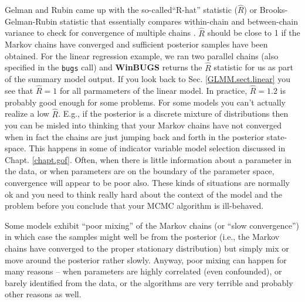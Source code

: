 Gelman and Rubin came up with the so-called``R-hat''
statistic ($\hat{R}$) or Brooks-Gelman-Rubin statistic that
essentially compares within-chain and between-chain variance to check
for convergence of multiple chains \citep{gelman_etal:1996}. $\hat{R}$
should be close to 1 if the Markov chains have converged and
sufficient posterior samples have been obtained. For the linear regression example, we ran two parallel chains (also specified in the {\tt bugs} call) and {\bf WinBUGS} returns the $\hat{R}$ statistic for us as part of the summary model output. If you look back to Sec. \ref{GLMM.sect.linear} you see that $\hat{R} = 1$ for all parmameters of the linear model.
In practice, $\hat{R}
= 1.2$ is probably good enough for some problems.  For some models you
can't actually realize a low $\hat{R}$. E.g., if the posterior is a
discrete mixture of distributions then you can be misled into thinking
that your Markov chains have not converged when in fact the chains are
just jumping back and forth in the posterior state-space. This happens
in some of indicator variable model selection discussed in Chapt. \ref{chapt.gof}.
Often, when there is little information about a parameter in the data,
or when parameters are on the boundary of the parameter space,
convergence will appear to be poor also.
These kinds of situations 
are normally ok and you need to think really hard about
the context of the model and the problem before you conclude that your
MCMC algorithm is ill-behaved.

Some models exhibit ``poor mixing'' of the Markov chains (or ``slow
convergence'') in which case the samples might well be from the
posterior (i.e., the Markov chains have converged to the proper
stationary distribution) but simply mix or move around the posterior
rather slowly. Anyway, poor mixing can happen for many reasons -- when
parameters are highly correlated (even confounded), or barely
identified from the data, or the algorithms are very terrible and
probably other reasons as well.

